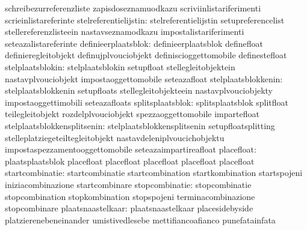                                   schreibezurreferenzliste         zapisdoseznamuodkazu
                                  scriviinlistariferimenti         scrieinlistareferinte
           stelreferentielijstin: stelreferentielijstin            setupreferencelist
                                  stellereferenzlisteein           nastavseznamodkazu
                                  impostalistariferimenti          seteazalistareferinte
             definieerplaatsblok: definieerplaatsblok              definefloat
                                  definieregleitobjekt             definujplvouciobjekt
                                  definiscioggettomobile           definestefloat
                stelplaatsblokin: stelplaatsblokin                 setupfloat
                                  stellegleitobjektein             nastavplvouciobjekt
                                  impostaoggettomobile             seteazafloat
             stelplaatsblokkenin: stelplaatsblokkenin              setupfloats
                                  stellegleitobjekteein            nastavplvouciobjekty
                                  impostaoggettimobili             seteazafloats
                splitsplaatsblok: splitsplaatsblok                 splitfloat
                                  teilegleitobjekt                 rozdelplvouciobjekt
                                  spezzaoggettomobile              impartefloat
     stelplaatsblokkensplitsenin: stelplaatsblokkensplitsenin      setupfloatsplitting
                                  stelleplatziegeteiltegleitobjekt nastavdeleniplvoucichobjektu
                                  impostaspezzamentooggettomobile  seteazaimpartireafloat
                      placefloat: plaatsplaatsblok                 placefloat
                                  placefloat                       placefloat
                                  placefloat                       placefloat %
                 startcombinatie: startcombinatie                  startcombination
                                  startkombination                 startspojeni
                                  iniziacombinazione               startcombinare
                  stopcombinatie: stopcombinatie                   stopcombination
                                  stopkombination                  stopspojeni
                                  terminacombinazione              stopcombinare
               plaatsnaastelkaar: plaatsnaastelkaar                placesidebyside
                                  platzierenebeneinander           umistivedlesebe
                                  mettifiancoafianco               punefatainfata

